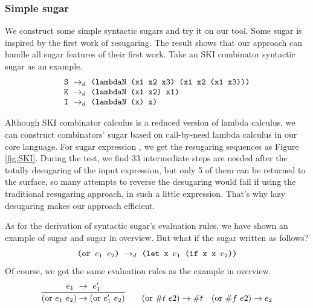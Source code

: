 \subsubsection{Simple sugar}
\label{mark:simple}

We construct some simple syntactic sugars and try it on our tool. Some sugar is inspired by the first work of resugaring\cite{resugaring}. The result shows that our approach can handle all sugar features of their first work.
Take an SKI combinator syntactic sugar as an example.
\[
\begin{array}{l}
\mbox{\tt S} ~\rightarrow_d~ \texttt{(lambdaN (x1 x2 x3) (x1 x2 (x1 x3)))}\\
\mbox{\tt K} ~\rightarrow_d~ \texttt{(lambdaN (x1 x2) x1)}\\
\mbox{\tt I} ~\rightarrow_d~ \texttt{(lambdaN (x) x)}
\end{array}
\]




Although SKI combinator calculus is a reduced version of lambda calculus, we can construct combinators' sugar based on call-by-need lambda calculus in our core language. For sugar expression , we get the resugaring sequences as Figure \ref{fig:SKI}. During the test, we find 33 intermediate steps are needed after the totally desugaring of the input expression, but only 5 of them can be returned to the surface, so many attempts to reverse the desugaring would fail if using the traditional resugaring approach, in such a little expression. That's why lazy desugaring makes our approach efficient.





As for the derivation of syntactic sugar's evaluation rules, we have shown an example of  sugar and  sugar in overview. But what if the  sugar written as follows?
\[\texttt{(or $e_1$ $e_2$)} ~\rightarrow_d~ \texttt{(let x $e_1$ (if x x $e_2$))}\]
Of course, we got the same evaluation rules as the example in overview.
\[
\begin{array}{c}
\infer {(\mbox{or}~e_1~e_2) \rightarrow (\mbox{or}~e_1'~e_2)} {e_1~ \rightarrow~e_1'}
\qquad
(\mbox{or}~\#t~e2) \rightarrow \#t
\quad
(\mbox{or}~\#f~e2) \rightarrow e_2 \\
\end{array}
\]

